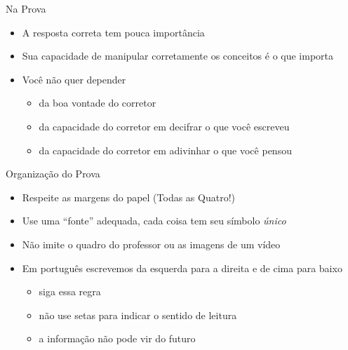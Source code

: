 \documentclass[fleqn,aspectratio=169,12pt]{beamer}
\begin{document}
\begin{frame}{Na Prova}
  \begin{itemize}[<+->]
    \item A resposta correta tem pouca importância
    \item Sua capacidade de manipular corretamente os conceitos é o que importa
    \item Você não quer depender
    \begin{itemize}
      \item da boa vontade do corretor
      \item da capacidade do corretor em decifrar o que você escreveu
      \item da capacidade do corretor em adivinhar o que você pensou
    \end{itemize}
  \end{itemize}
\end{frame}

\begin{frame}{Organização do Prova}
  \begin{itemize}[<+->]
    \item Respeite as margens do papel (Todas as Quatro!)
    \item Use uma ``fonte'' adequada, cada coisa tem seu símbolo \emph{único}
    \item Não imite o quadro do professor ou as imagens de um vídeo
    \item Em português escrevemos da esquerda para a direita e de cima para baixo
    \begin{itemize}
      \item siga essa regra
      \item não use setas para indicar o sentido de leitura
      \item a informação não pode vir do futuro
    \end{itemize}
  \end{itemize}
\end{frame}
\end{document}
